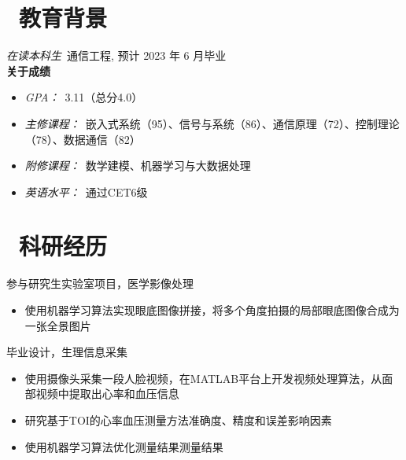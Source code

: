 \documentclass{resume}
\begin{document}


\section{\faGraduationCap\  教育背景}
\textit{在读本科生}\ 通信工程, 预计 2023 年 6 月毕业 \\ 
\textbf{关于成绩} 
\begin{itemize}
    \item \textit{GPA：}\ 3.11（总分4.0）
    \item \textit{主修课程：}\ 嵌入式系统（95）、信号与系统（86）、通信原理（72）、控制理论（78）、数据通信（82）
    \item \textit{附修课程：}\ 数学建模、机器学习与大数据处理
    \item \textit{英语水平：}\ 通过CET6级
\end{itemize}

\section{\faFlask\ 科研经历}
\begin{onehalfspacing}
参与研究生实验室项目，医学影像处理
\begin{itemize}
  \item 使用机器学习算法实现眼底图像拼接，将多个角度拍摄的局部眼底图像合成为一张全景图片
\end{itemize}
\end{onehalfspacing}

\begin{onehalfspacing}
毕业设计，生理信息采集
\begin{itemize}
  \item 使用摄像头采集一段人脸视频，在MATLAB平台上开发视频处理算法，从面部视频中提取出心率和血压信息
  \item 研究基于TOI的心率血压测量方法准确度、精度和误差影响因素
  \item 使用机器学习算法优化测量结果测量结果
\end{itemize}
\end{onehalfspacing}
\end{document}
